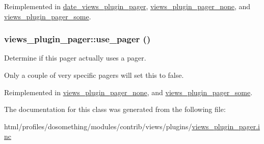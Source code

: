 Reimplemented in \hyperlink{classdate__views__plugin__pager_ad8887dff6ec775d8333c040306e6524d}{date\_\-views\_\-plugin\_\-pager}, \hyperlink{classviews__plugin__pager__none_a2a4be240474e0db5577ff4f8b7364b15}{views\_\-plugin\_\-pager\_\-none}, and \hyperlink{classviews__plugin__pager__some_adb625dcd5e5cf98f964f4e1c25681a6e}{views\_\-plugin\_\-pager\_\-some}.\hypertarget{classviews__plugin__pager_a0b77996aaa7a7b23effc4d3a6e055659}{
\subsubsection[{use\_\-pager}]{\setlength{\rightskip}{0pt plus 5cm}views\_\-plugin\_\-pager::use\_\-pager ()}}
\label{classviews__plugin__pager_a0b77996aaa7a7b23effc4d3a6e055659}
Determine if this pager actually uses a pager.

Only a couple of very specific pagers will set this to false. 

Reimplemented in \hyperlink{classviews__plugin__pager__none_a60e31c5b5a026cf9ce14d6d8664c4407}{views\_\-plugin\_\-pager\_\-none}, and \hyperlink{classviews__plugin__pager__some_a095fbbfc79c16f25158348a0e8eada83}{views\_\-plugin\_\-pager\_\-some}.

The documentation for this class was generated from the following file:\begin{DoxyCompactItemize}
\item 
html/profiles/dosomething/modules/contrib/views/plugins/\hyperlink{views__plugin__pager_8inc}{views\_\-plugin\_\-pager.inc}\end{DoxyCompactItemize}
